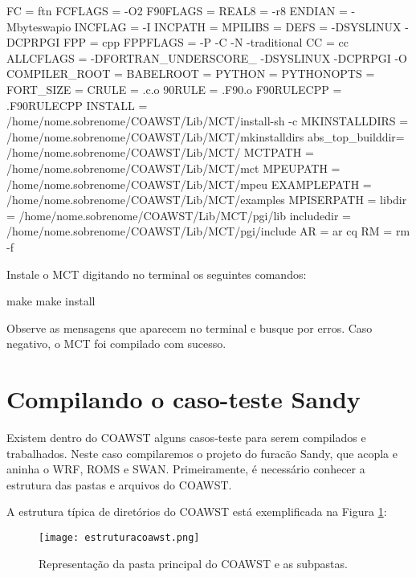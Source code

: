 \begin{bashcode}
FC  	    = ftn
FCFLAGS	 = -O2
F90FLAGS        = 
REAL8           = -r8
ENDIAN          = -Mbyteswapio
INCFLAG         = -I
INCPATH         =
MPILIBS         = 
DEFS            = -DSYSLINUX -DCPRPGI
FPP	     = cpp
FPPFLAGS        = -P -C -N -traditional
CC              = cc
ALLCFLAGS       = -DFORTRAN_UNDERSCORE_ -DSYSLINUX -DCPRPGI -O
COMPILER_ROOT   = 
BABELROOT       = 
PYTHON          = 
PYTHONOPTS      = 
FORT_SIZE       = 
CRULE           = .c.o
90RULE          = .F90.o
F90RULECPP      = .F90RULECPP
INSTALL         = /home/nome.sobrenome/COAWST/Lib/MCT/install-sh -c
MKINSTALLDIRS   = /home/nome.sobrenome/COAWST/Lib/MCT/mkinstalldirs
abs_top_builddir= /home/nome.sobrenome/COAWST/Lib/MCT/
MCTPATH         = /home/nome.sobrenome/COAWST/Lib/MCT/mct
MPEUPATH        = /home/nome.sobrenome/COAWST/Lib/MCT/mpeu
EXAMPLEPATH     = /home/nome.sobrenome/COAWST/Lib/MCT/examples
MPISERPATH      = 
libdir          = /home/nome.sobrenome/COAWST/Lib/MCT/pgi/lib
includedir      = /home/nome.sobrenome/COAWST/Lib/MCT/pgi/include
AR	      = ar cq
RM	      = rm -f
\end{bashcode}
\bigskip

\noindent Instale o MCT digitando no terminal os seguintes comandos:
\bigskip

\begin{bashcode}
make
make install
\end{bashcode}
\bigskip
\noindent Observe as mensagens que aparecem no terminal e busque por erros. Caso negativo, o MCT foi compilado com sucesso.
\bigskip


\section{Compilando o caso-teste Sandy}
\bigskip

\noindent Existem dentro do COAWST alguns casos-teste para serem compilados e trabalhados. Neste caso compilaremos o projeto do furacão Sandy, que acopla e aninha o WRF, ROMS e SWAN. Primeiramente, é necessário conhecer a estrutura das pastas e arquivos do COAWST.
\bigskip

\noindent A estrutura típica de diretórios do COAWST está exemplificada na Figura \textcolor{bleu_cite}{\ref{pastascoa}}:
\bigskip

\begin{figure}[H]
    \centering
    \texttt{[image: estruturacoawst.png]}
    \caption{Representação da pasta principal do COAWST e as subpastas.}
    \label{pastascoa}
\end{figure}
\bigskip

